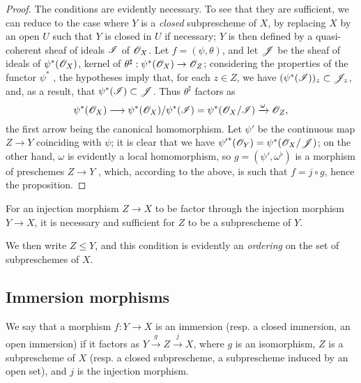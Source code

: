 \begin{proof}
\label{proof-I.4.1.9}
The conditions are evidently necessary.
To see that they are sufficient, we can reduce to the case where $Y$ is a \emph{closed} subprescheme of $X$, by replacing $X$ by an open $U$ such that $Y$ is closed in $U$  if necessary;
$Y$ is then defined by a quasi-coherent sheaf of ideals $\mathscr{I}$ of $\mathscr{O}_X$.
Let $f=(\psi,\theta)$, and let $\mathscr{J}$ be the sheaf of ideals of $\psi^*(\mathscr{O}_X)$, kernel of $\theta^\sharp:\psi^*(\sh{O}_X)\to\sh{O}_Z$;
considering the properties of the functor $\psi^*$ , the hypotheses imply that, for each $z\in Z$, we have $(\psi^*(\mathscr{I}))_z\subset\mathscr{J}_z$, and, as a result, that $\psi^*(\mathscr{I})\subset\mathscr{J}$.
Thus $\theta^\sharp$ factors as
\[
  \psi^*(\sh{O}_X)\to\psi^*(\sh{O}_X)/\psi^*(\sh{I})=\psi^*(\sh{O}_X/\sh{I})\xrightarrow{\omega}\sh{O}_Z,
\]
the first arrow being the canonical homomorphism.
Let $\psi'$ be the continuous map $Z\to Y$ coinciding with $\psi$;
it is clear that we have ${\psi'}^*(\mathscr{O}_Y)=\psi^*(\mathscr{O}_X/\mathscr{J})$;
on the other hand, $\omega$ is evidently a local homomorphism, so $g=(\psi',\omega^\flat)$ is a morphism
of preschemes $Z\to Y$ , which, according to the above, is such that $f=j\circ g$, hence the proposition.
\end{proof}

\begin{corollary}[4.1.10]
\label{I.4.1.10}
For an injection morphism $Z\to X$ to be factor through the injection morphism $Y\to X$, it is necessary and sufficient for $Z$ to be a subprescheme of $Y$.
\end{corollary}

We then write $Z\leq Y$, and this condition is evidently an \emph{ordering} on the set of subpreschemes of $X$.

\subsection{Immersion morphisms}
\label{subsection:I.4.2}

\begin{definition}[4.2.1]
\label{I.4.2.1}
We say that a morphism $f:Y\to X$ is an immersion (resp. a closed immersion, an open immersion) if it factors as $Y\xrightarrow{g}Z\xrightarrow{j}X$, where $g$ is an isomorphism, $Z$ is a subprescheme of $X$ (resp. a closed subprescheme, a subprescheme induced by an open set), and $j$ is the injection morphism.
\end{definition}

